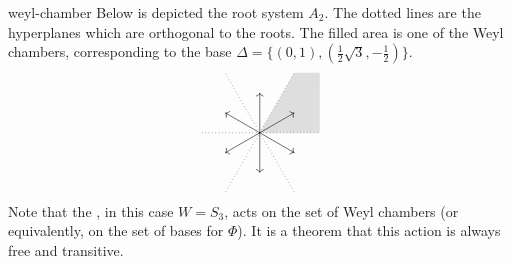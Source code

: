 \begin{example}{weyl-chamber}
    Below is depicted the root system $A_2$. The dotted lines are the hyperplanes which are orthogonal to the roots. The filled area is one of the Weyl chambers, corresponding to the base $\Delta = \{ (0, 1), (\frac{1}{2} \sqrt{3}, -\frac{1}{2}) \}$.
    \[ \begin{tikzpicture}
        \path[fill=gray!50, opacity=0.5] (0, 0) -- (0.866, 1.5) -- (1.5, 1.5) -- (1.5, 0);
        
        \draw[->] (0, 0) -- (0.866, 0.5);
        \draw[->] (0, 0) -- (0, 1);
        \draw[->] (0, 0) -- (-0.866, 0.5);
        \draw[->] (0, 0) -- (-0.866, -0.5);
        \draw[->] (0, 0) -- (0, -1);
        \draw[->] (0, 0) -- (0.866, -0.5);
        
        \draw[dotted] (0, 0) -- (1.5, 0);
        \draw[dotted] (0, 0) -- (-1.5, 0);
        \draw[dotted] (0, 0) -- (0.866, 1.5);
        \draw[dotted] (0, 0) -- (-0.866, 1.5);
        \draw[dotted] (0, 0) -- (0.866, -1.5);
        \draw[dotted] (0, 0) -- (-0.866, -1.5);
    \end{tikzpicture} \]
    Note that the , in this case $W = S_3$, acts on the set of Weyl chambers (or equivalently, on the set of bases for $\Phi$). It is a theorem that this action is always free and transitive.
\end{example}

